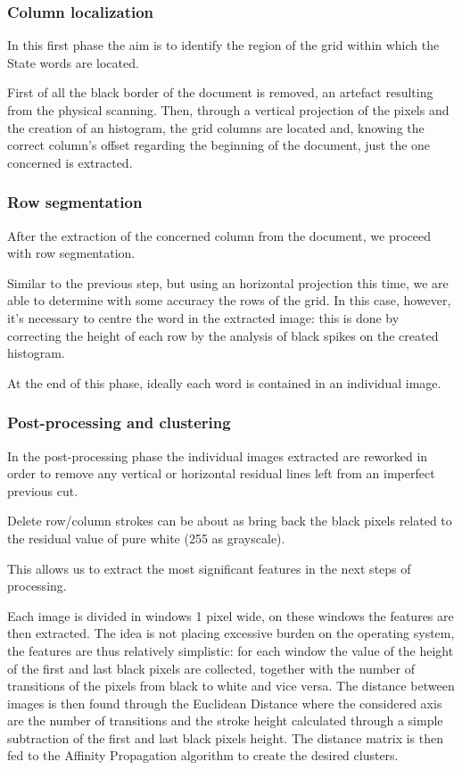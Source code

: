 \subsubsection{Column localization}

In this first phase the aim is to identify the region of the grid within which the State words are located. 

First of all the black border of the document is removed, an artefact resulting from the physical scanning. Then, through a vertical projection of the pixels and the creation of an histogram, the grid columns are located and, knowing the correct column's offset regarding the beginning of the document, just the one concerned is extracted.

\subsubsection{Row segmentation}

After the extraction of the concerned column from the document, we proceed with row segmentation.

Similar to the previous step, but using an horizontal projection this time, we are able to determine with some accuracy the rows of the grid. In this case, however, it's necessary to centre the word in the extracted image: this is done by correcting the height of each row by the analysis of black spikes on the created histogram.

At the end of this phase, ideally each word is contained in an individual image.

\subsubsection{Post-processing and clustering}

In the post-processing phase the individual images extracted are reworked in order to remove any  vertical or horizontal residual lines left from an imperfect previous cut.

Delete row/column strokes can be about as bring back the black pixels related to the residual value of pure white (255 as grayscale).

This allows us to extract the most significant features in the next steps of processing.

Each image is divided in windows 1 pixel wide, on these windows the features are then extracted.
The idea is not placing excessive burden on the operating system, the features are thus relatively simplistic: for each window the value of the height of the first and last black pixels are collected, together with the number of transitions of the pixels from black to white and vice versa.
The distance between images is then found through the Euclidean Distance where the considered axis are the number of transitions and the stroke height calculated through a simple subtraction of the first and last black pixels height.
The distance matrix is then fed to the Affinity Propagation algorithm to create the desired clusters.

